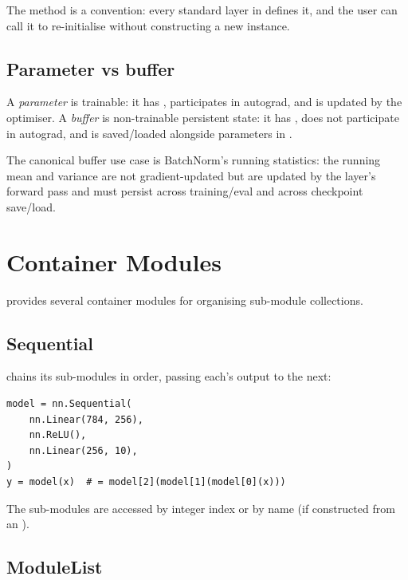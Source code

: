 The  method is a convention: every standard
layer in  defines it, and the user can call it to
re-initialise without constructing a new instance.

\subsection{Parameter vs buffer}
\label{ssec:module_system:param_vs_buffer}

A \emph{parameter} is trainable: it has ,
participates in autograd, and is updated by the optimiser. A
\emph{buffer} is non-trainable persistent state: it has
, does not participate in autograd, and
is saved/loaded alongside parameters in .

The canonical buffer use case is BatchNorm's running statistics:
the running mean and variance are not gradient-updated but are
updated by the layer's forward pass and must persist across
training/eval and across checkpoint save/load.

\section{Container Modules}
\label{sec:module_system:containers}

 provides several container modules for organising
sub-module collections.

\subsection{Sequential}
\label{ssec:module_system:sequential}

 chains its sub-modules in order, passing each's
output to the next:

\begin{lstlisting}[style=lucid,language=LucidPython]
model = nn.Sequential(
    nn.Linear(784, 256),
    nn.ReLU(),
    nn.Linear(256, 10),
)
y = model(x)  # = model[2](model[1](model[0](x)))
\end{lstlisting}

The sub-modules are accessed by integer index or by name (if
constructed from an ).

\subsection{ModuleList}
\label{ssec:module_system:modulelist}

